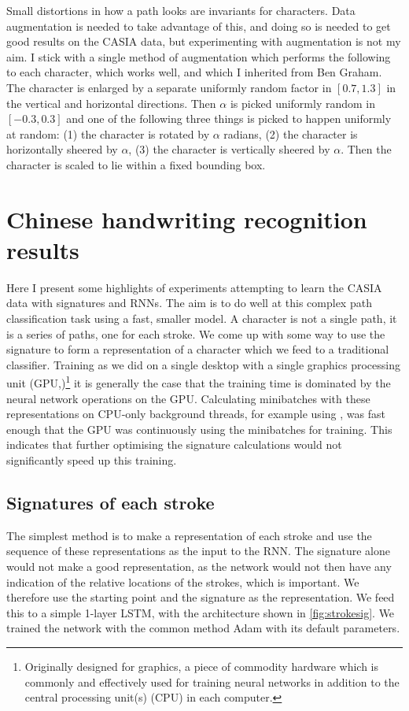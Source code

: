 Small distortions in how a path looks are invariants for characters. Data augmentation is needed to take advantage of this, and doing so is needed to get good results on the CASIA data, but experimenting with augmentation is not my aim. I stick with a single method of augmentation which performs the following to each character, which works well, and which I inherited from Ben Graham.
The character is enlarged by a separate uniformly random factor in $[0.7,1.3]$ in the vertical and horizontal directions.
Then $\alpha$ is picked uniformly random in $[-0.3,0.3]$ and one of the following three things is picked to happen uniformly at random: (1) the character is rotated by $\alpha$ radians, (2) the character is horizontally sheered by $\alpha$, (3) the character is vertically sheered by $\alpha$. Then the character is scaled to lie within a fixed bounding box.

\section{Chinese handwriting recognition results}
\label{sec:chinese}
Here I present some highlights of experiments attempting to learn the CASIA data with signatures and RNNs. 
The aim is to do well at this complex path classification task using a fast, smaller model.
A character is not a single path, it is a series of paths, one for each stroke. 
We come up with some way to use the signature to form a representation of a character which we feed to a traditional classifier.
Training as we did on a single desktop with a single graphics processing unit (GPU,)\footnote{Originally designed for graphics, a piece of commodity hardware which is commonly and effectively used for training neural networks in addition to the central processing unit(s) (CPU) in each computer.} it is generally the case that the training time is dominated by the neural network operations on the GPU\@. 
Calculating minibatches with these representations on CPU-only background threads, for example using \ii, was fast enough that the GPU was continuously using the minibatches for training.
This indicates that further optimising the signature calculations would not significantly speed up this training.

\subsection{Signatures of each stroke}
The simplest method is to make a representation of each stroke and use the sequence of these representations as the input to the RNN\@. The signature alone would not make a good representation, as the network would not then have any indication of the relative locations of the strokes, which is important. We therefore use the starting point and the signature as the representation. We feed this to a  simple 1-layer LSTM, with the architecture shown in \autoref{fig:strokesig}. We trained the network with the common method Adam \cite{Adam} with its default parameters.

